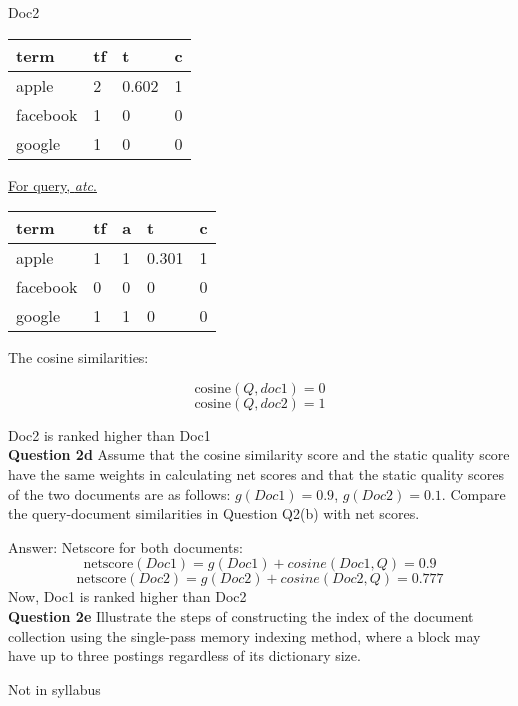 \documentclass[11pt,a4paper]{report}
\begin{document}
\begin{multicols*}{2}
\noindent Doc2

\begin{center}
\begin{tabular}{|l | l | l | l|}
    \hline
    term     & tf & t & c \\
    \hline
    apple    & 2 & 0.602 & 1 \\
    facebook & 1 & 0 & 0\\
    google   & 1 & 0 & 0\\
    \hline
\end{tabular}
\end{center}

\noindent \underline{For query, \textit{atc}.}

\begin{center}
\begin{tabular}{|l | l | l | l | l |}
    \hline
    term     & tf & a & t & c \\
    \hline
    apple    & 1  & 1 & 0.301 & 1\\
    facebook & 0  & 0 & 0 & 0\\
    google   & 1  & 1 & 0 & 0 \\
    \hline
\end{tabular}
\end{center}

\noindent The cosine similarities:

$$\text{cosine}(Q, doc1) = 0$$
$$\text{cosine}(Q, doc2) = 1$$

\noindent Doc2 is ranked higher than Doc1\\

\noindent \textbf{Question 2d} Assume that the cosine similarity score and the static quality score have the same weights in calculating net scores and that the static quality scores of the two documents are as follows: $g(Doc1)=0.9$, $g(Doc2)=0.1$. Compare the query-document similarities in Question Q2(b) with net scores.

\noindent Answer: Netscore for both documents:
$$\text{netscore}(Doc1) = g(Doc1) + cosine(Doc1, Q) = 0.9$$
$$\text{netscore}(Doc2) = g(Doc2) + cosine(Doc2, Q) = 0.777$$
\noindent Now, Doc1 is ranked higher than Doc2 \\

\noindent \textbf{Question 2e} Illustrate the steps of constructing the index of the document collection using the single-pass memory indexing method, where a block may have up to three postings regardless of its dictionary size. 

\noindent Not in syllabus \\


\end{multicols*}
\end{document}
